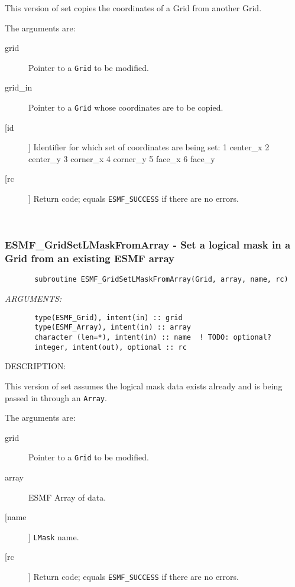 {       This version of set copies the coordinates of a Grid from another Grid.
  
       The arguments are:
       \begin{description}
       \item[grid] 
            Pointer to a {\tt Grid} to be modified.
       \item[grid\_in] 
            Pointer to a {\tt Grid} whose coordinates are to be copied.
       \item[[id]]
            Identifier for which set of coordinates are being set:
               1  center\_x
               2  center\_y
               3  corner\_x
               4  corner\_y
               5  face\_x
               6  face\_y 
       \item[[rc]] 
            Return code; equals {\tt ESMF\_SUCCESS} if there are no errors.
       \end{description}
   
 
\mbox{}\hrulefill\ 
 
\subsubsection{ESMF\_GridSetLMaskFromArray - Set a logical mask in a Grid from an existing ESMF array}


 
\begin{verbatim}       subroutine ESMF_GridSetLMaskFromArray(Grid, array, name, rc)\end{verbatim}{\em ARGUMENTS:}
\begin{verbatim}       type(ESMF_Grid), intent(in) :: grid
       type(ESMF_Array), intent(in) :: array
       character (len=*), intent(in) :: name  ! TODO: optional?
       integer, intent(out), optional :: rc            \end{verbatim}
{\sf DESCRIPTION:\\ }


       This version of set assumes the logical mask data exists already and is
       being passed in through an {\tt Array}.
  
       The arguments are:
       \begin{description}
       \item[grid] 
            Pointer to a {\tt Grid} to be modified.
       \item[array]
            ESMF Array of data.
       \item [[name]]
             {\tt LMask} name.
       \item[[rc]] 
            Return code; equals {\tt ESMF\_SUCCESS} if there are no errors.
       \end{description}
   
}
